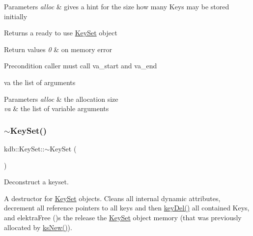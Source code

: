 \begin{DoxyParams}{Parameters}
{\em alloc} & gives a hint for the size how many Keys may be stored initially \\
\hline
\end{DoxyParams}
\begin{DoxyReturn}{Returns}
a ready to use \mbox{\hyperlink{classkdb_1_1KeySet}{Key\+Set}} object 
\end{DoxyReturn}

\begin{DoxyRetVals}{Return values}
{\em 0} & on memory error\\
\hline
\end{DoxyRetVals}
\begin{DoxyPrecond}{Precondition}
caller must call va\+\_\+start and va\+\_\+end 
\end{DoxyPrecond}
\begin{DoxyParagraph}{va the list of arguments}

\end{DoxyParagraph}

\begin{DoxyParams}{Parameters}
{\em alloc} & the allocation size \\
\hline
{\em va} & the list of variable arguments \\
\hline
\end{DoxyParams}
\mbox{\label{classkdb_1_1KeySet_ade654f92bddec24abad1b651e828f2b8}} 
\subsubsection{\texorpdfstring{$\sim$KeySet()}{~KeySet()}}
{\footnotesize\ttfamily kdb\+::\+Key\+Set\+::$\sim$\+Key\+Set (\begin{DoxyParamCaption}{ }\end{DoxyParamCaption})\hspace{0.3cm}{\ttfamily [inline]}}



Deconstruct a keyset. 

A destructor for \mbox{\hyperlink{classkdb_1_1KeySet}{Key\+Set}} objects. Cleans all internal dynamic attributes, decrement all reference pointers to all keys and then \mbox{\hyperlink{group__key_ga3df95bbc2494e3e6703ece5639be5bb1}{key\+Del()}} all contained Keys, and elektra\+Free ()s the release the \mbox{\hyperlink{classkdb_1_1KeySet}{Key\+Set}} object memory (that was previously allocated by \mbox{\hyperlink{group__keyset_ga671e1aaee3ae9dc13b4834a4ddbd2c3c}{ks\+New()}}).



